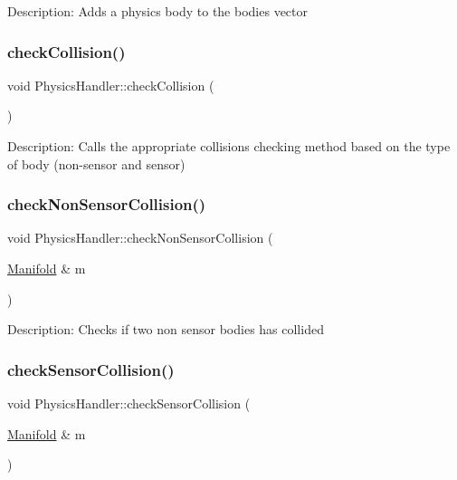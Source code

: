 Description\+: Adds a physics body to the bodies vector \mbox{\label{class_physics_handler_a59608df05a59b284957c2a06a3714a90}} 
\subsubsection{\texorpdfstring{checkCollision()}{checkCollision()}}
{\footnotesize\ttfamily void Physics\+Handler\+::check\+Collision (\begin{DoxyParamCaption}{ }\end{DoxyParamCaption})\hspace{0.3cm}{\ttfamily [static]}}

Description\+: Calls the appropriate collisions checking method based on the type of body (non-\/sensor and sensor) \mbox{\label{class_physics_handler_ae602274d78112796fa9ef3466485d9fd}} 
\subsubsection{\texorpdfstring{checkNonSensorCollision()}{checkNonSensorCollision()}}
{\footnotesize\ttfamily void Physics\+Handler\+::check\+Non\+Sensor\+Collision (\begin{DoxyParamCaption}\item[{\mbox{\hyperlink{struct_physics_handler_1_1_manifold}{Manifold}} \&}]{m }\end{DoxyParamCaption})\hspace{0.3cm}{\ttfamily [static]}}

Description\+: Checks if two non sensor bodies has collided \mbox{\label{class_physics_handler_a1f62975783786feee0c95d8ad4aa741f}} 
\subsubsection{\texorpdfstring{checkSensorCollision()}{checkSensorCollision()}}
{\footnotesize\ttfamily void Physics\+Handler\+::check\+Sensor\+Collision (\begin{DoxyParamCaption}\item[{\mbox{\hyperlink{struct_physics_handler_1_1_manifold}{Manifold}} \&}]{m }\end{DoxyParamCaption})\hspace{0.3cm}{\ttfamily [static]}}

